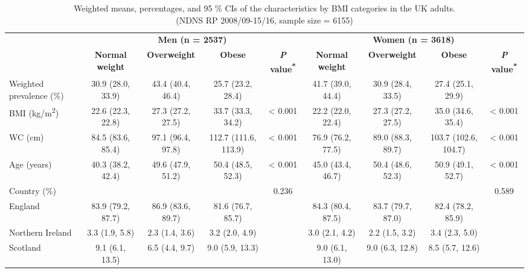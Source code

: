 \begin{table}
	
		
		\caption{\label{tab:tab1BMI}Weighted means, percentages, and 95 \% CIs of the characteristics by BMI categories in the UK adults. \\ (NDNS RP 2008/09-15/16, sample size = 6155)}
		\centering
		\fontsize{8}{11}\selectfont
		\begin{tabular}[t]{lcccccccc}
			\hiderowcolors
			\toprule
			\multicolumn{1}{c}{ } & \multicolumn{4}{c}{\textbf{Men (n = 2537)}} & \multicolumn{4}{c}{\textbf{Women (n = 3618)}} \\
			\cmidrule(l{2pt}r{2pt}){2-5} \cmidrule(l{2pt}r{2pt}){6-9}
			& \textbf{Normal weight} & \textbf{Overweight} & \textbf{Obese} & \textbf{\textit{P} value\textsuperscript{*}} & \textbf{Normal weight} & \textbf{Overweight} & \textbf{Obese} & \textbf{\textit{P} value\textsuperscript{*}}\\
			\midrule
			\showrowcolors
			Weighted prevalence (\%) & 30.9 (28.0, 33.9) & 43.4 (40.4, 46.4) & 25.7 (23.2, 28.4) &  & 41.7 (39.0, 44.4) & 30.9 (28.4, 33.5) & 27.4 (25.1, 29.9) & \\
			BMI (kg/m\textsuperscript{2}) & 22.6 (22.3, 22.8) & 27.3 (27.2, 27.5) & 33.7 (33.3, 34.2) & < 0.001 & 22.2 (22.0, 22.4) & 27.3 (27.2, 27.5) & 35.0 (34.6, 35.4) & < 0.001\\
			WC (cm) & 84.5 (83.6, 85.4) & 97.1 (96.4, 97.8) & 112.7 (111.6, 113.9) & < 0.001 & 76.9 (76.2, 77.5) & 89.0 (88.3, 89.7) & 103.7 (102.6, 104.7) & < 0.001\\
			Age (years) & 40.3 (38.2, 42.4) & 49.6 (47.9, 51.2) & 50.4 (48.5, 52.3) & < 0.001 & 45.0 (43.4, 46.7) & 50.4 (48.6, 52.3) & 50.9 (49.1, 52.7) & < 0.001\\
			Country (\%) &  &  &  & 0.236 &  &  &  & 0.589\\
			\hspace{1em}England & 83.9 (79.2, 87.7) & 86.9 (83.6, 89.7) & 81.6 (76.7, 85.7) &  & 84.3 (80.4, 87.5) & 83.7 (79.7, 87.0) & 82.4 (78.2, 85.9) & \\
			\hspace{1em}Northern Ireland & 3.3 (1.9, 5.8) & 2.3 (1.4, 3.6) & 3.2 (2.0, 4.9) &  & 3.0 (2.1, 4.2) & 2.2 (1.5, 3.2) & 3.4 (2.3, 5.0) & \\
			\hspace{1em}Scotland & 9.1 (6.1, 13.5) & 6.5 (4.4, 9.7) & 9.0 (5.9, 13.3) &  & 9.0 (6.1, 13.0) & 9.0 (6.3, 12.8) & 8.5 (5.7, 12.6) & \\

\end{tabular}
\end{table}
